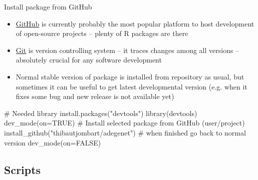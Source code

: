 \documentclass[compress, ucs, xelatex, 11pt, xcolor=svgnames,
  hyperref={
    bookmarks=true,
    unicode=true,
    colorlinks=true,
    pdftitle={Molecular data in R},
    plainpages=false,
    pdfauthor={Vojtech Zeisek},
    pdfsubject={Course about phylogeny and evolution in R},
    pdfcreator={XeLaTeX},
    pdfkeywords={R, evolution, phylogeny, molecular data},
    linkcolor=Tomato,
    anchorcolor=SaddleBrown,
    citecolor=Goldenrod,
    filecolor=DarkMagenta,
    menucolor=Sienna,
    urlcolor=DarkTurquoise,
    pdftex},
  url={hyphens, lowtilde} %
  ]{beamer}
\begin{document}
\begin{frame}[fragile]{Install package from GitHub}
  \begin{itemize}
    \item \href{https://github.com/}{GitHub} is currently probably the most popular platform to host development of open-source projects -- plenty of R packages are there
    \item \href{https://git-scm.com/}{Git} is version controlling system -- it traces changes among all versions -- absolutely crucial for any software development
    \item Normal stable version of package is installed from repository as usual, but sometimes it can be useful to get latest developmental version (e.g. when it fixes some bug and new release is not available yet)
  \end{itemize}
  \begin{spluscode}
    # Needed library
    install.packages("devtools")
    library(devtools)
    dev_mode(on=TRUE)
    # Install selected package from GitHub (user/project)
    install_github("thibautjombart/adegenet")
    # when finished go back to normal version
    dev_mode(on=FALSE)
  \end{spluscode}
\end{frame}

\subsection{Scripts}
\end{document}

